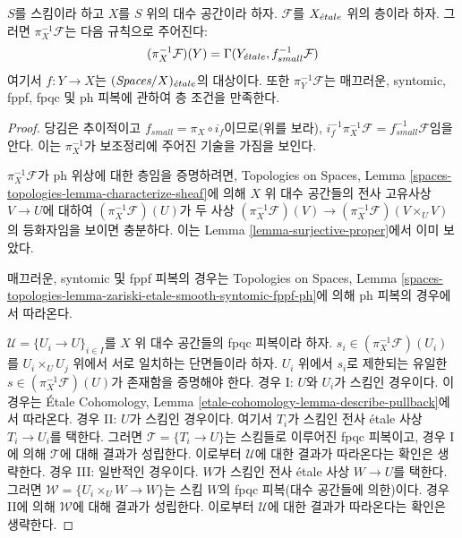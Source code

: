\begin{lemma}
\label{lemma-describe-pullback}
$S$를 스킴이라 하고 $X$를 $S$ 위의 대수 공간이라 하자.
$\mathcal{F}$를 $X_{\acute{e}tale}$ 위의 층이라 하자. 그러면
$\pi_X^{-1}\mathcal{F}$는 다음 규칙으로 주어진다:
$$
(\pi_X^{-1}\mathcal{F})(Y) = \Gamma(Y_{\acute{e}tale}, f_{small}^{-1}\mathcal{F})
$$
여기서 $f : Y \to X$는 $(\textit{Spaces}/X)_{\acute{e}tale}$의 대상이다.
또한 $\pi_Y^{-1}\mathcal{F}$는 매끄러운, syntomic, fppf, fpqc 및 ph
피복에 관하여 층 조건을 만족한다.
\end{lemma}

\begin{proof}
당김은 추이적이고 $f_{small} = \pi_X \circ i_f$이므로(위를 보라),
$i_f^{-1} \pi_X^{-1}\mathcal{F} = f_{small}^{-1}\mathcal{F}$임을 안다.
이는 $\pi_X^{-1}$가 보조정리에 주어진 기술을 가짐을 보인다.

\medskip\noindent
$\pi_X^{-1}\mathcal{F}$가 ph 위상에 대한 층임을 증명하려면,
Topologies on Spaces, Lemma
\ref{spaces-topologies-lemma-characterize-sheaf}에 의해
$X$ 위 대수 공간들의 전사 고유사상 $V \to U$에 대하여
$(\pi_X^{-1}\mathcal{F})(U)$가 두 사상
$(\pi_X^{-1}\mathcal{F})(V) \to (\pi_X^{-1}\mathcal{F})(V \times_U V)$의
등화자임을 보이면 충분하다. 이는 Lemma
\ref{lemma-surjective-proper}에서 이미 보았다.

\medskip\noindent
매끄러운, syntomic 및 fppf 피복의 경우는 Topologies on Spaces, Lemma
\ref{spaces-topologies-lemma-zariski-etale-smooth-syntomic-fppf-ph}에 의해
ph 피복의 경우에서 따라온다.

\medskip\noindent
$\mathcal{U} = \{U_i \to U\}_{i \in I}$를 $X$ 위 대수 공간들의 fpqc
피복이라 하자. $s_i \in (\pi_X^{-1}\mathcal{F})(U_i)$를
$U_i \times_U U_j$ 위에서 서로 일치하는 단면들이라 하자.
$U_i$ 위에서 $s_i$로 제한되는 유일한
$s \in (\pi_X^{-1}\mathcal{F})(U)$가 존재함을 증명해야 한다.
경우 I: $U$와 $U_i$가 스킴인 경우이다. 이 경우는
\'Etale Cohomology, Lemma
\ref{etale-cohomology-lemma-describe-pullback}에서 따라온다.
경우 II: $U$가 스킴인 경우이다. 여기서 $T_i$가 스킴인 전사
\'etale 사상 $T_i \to U_i$를 택한다. 그러면
$\mathcal{T} = \{T_i \to U\}$는 스킴들로 이루어진 fpqc 피복이고,
경우 I에 의해 $\mathcal{T}$에 대해 결과가 성립한다.
이로부터 $\mathcal{U}$에 대한 결과가 따라온다는 확인은 생략한다.
경우 III: 일반적인 경우이다. $W$가 스킴인 전사 \'etale 사상
$W \to U$를 택한다. 그러면
$\mathcal{W} = \{U_i \times_U W \to W\}$는 스킴 $W$의
fpqc 피복(대수 공간들에 의한)이다.
경우 II에 의해 $\mathcal{W}$에 대해 결과가 성립한다.
이로부터 $\mathcal{U}$에 대한 결과가 따라온다는 확인은 생략한다.
\end{proof}

